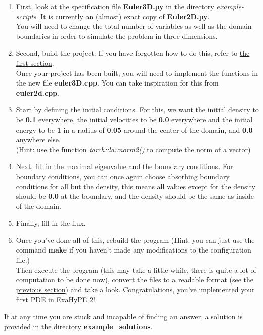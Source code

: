 \documentclass[12pt,letterpaper]{article}
\begin{document}
\begin{enumerate}
    \item     
        First, look at the specification file \textbf{Euler3D.py} in the directory \textit{example-scripts}. It is currently an (almost) exact copy of \textbf{Euler2D.py}.\\
        You will need to change the total number of variables as well as the domain boundaries in order to simulate the problem in three dimensions.
    \item
        Second, build the project. If you have forgotten how to do this, refer to \hyperref[Verifying_and_building]{the first section}.\\
        
        Once your project has been built, you will need to implement the functions in the new file \textbf{euler3D.cpp}. You can take inspiration for this from \textbf{euler2d.cpp}.
    \item
        Start by defining the initial conditions. For this, we want the initial density to be \textbf{0.1} everywhere, the initial velocities to be \textbf{0.0} everywhere and the initial energy to be \textbf{1} in a radius of \textbf{0.05} around the center of the domain, and \textbf{0.0} anywhere else.\\
        (Hint: use the function \textit{tarch::la::norm2()} to compute the norm of a vector)
    \item
        Next, fill in the maximal eigenvalue and the boundary conditions. For boundary conditions, you can once again choose absorbing boundary conditions for all but the density, this means all values except for the density should be \textbf{0.0} at the boundary, and the density should be the same as inside of the domain.
    \item
        Finally, fill in the flux.
    \item
        Once you've done all of this, rebuild the program (Hint: you can just use the command \textbf{make} if you haven't made any modifications to the configuration file.)\\ Then execute the program (this may take a little while, there is quite a lot of computation to be done now), convert the files to a readable format (\hyperref[Visualize]{see the previous section}) and take a look. Congratulations, you've implemented your first PDE in ExaHyPE 2!
\end{enumerate}

If at any time you are stuck and incapable of finding an answer, a solution is provided in the directory \textbf{example\_solutions}.
\end{document}

